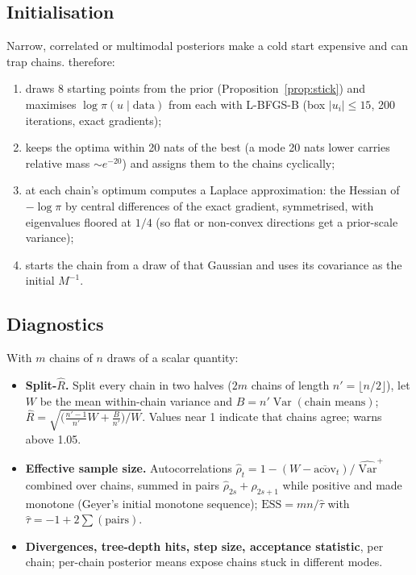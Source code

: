 \documentclass[11pt]{article}
\theoremstyle{definition}
\theoremstyle{remark}
\newcommand{\code}[1]{\texttt{\detokenize{#1}}}
\DeclareMathOperator{\Var}{Var}
\begin{document}
\subsection{Initialisation}
Narrow, correlated or multimodal posteriors make a cold start expensive and can trap chains. \code{exact_gw} therefore:
\begin{enumerate}
\item draws 8 starting points from the prior (Proposition~\ref{prop:stick}) and maximises $\log\pi(u\mid\text{data})$ from each with L-BFGS-B (box $|u_i|\le15$, 200 iterations, exact gradients);
\item keeps the optima within 20 nats of the best (a mode 20 nats lower carries relative mass $\sim e^{-20}$) and assigns them to the chains cyclically;
\item at each chain's optimum computes a Laplace approximation: the Hessian of $-\log\pi$ by central differences of the exact gradient, symmetrised, with eigenvalues floored at $1/4$ (so flat or non-convex directions get a prior-scale variance);
\item starts the chain from a draw of that Gaussian and uses its covariance as the initial $M^{-1}$.
\end{enumerate}

\subsection{Diagnostics}
With $m$ chains of $n$ draws of a scalar quantity:
\begin{itemize}
\item \textbf{Split-$\hat R$.} Split every chain in two halves ($2m$ chains of length $n'=\lfloor n/2\rfloor$), let $W$ be the mean within-chain variance and $B=n'\Var(\text{chain means})$; $\hat R=\sqrt{\big(\frac{n'-1}{n'}W+\frac{B}{n'}\big)/W}$. Values near 1 indicate that chains agree; \code{exact_gw} warns above 1.05.
\item \textbf{Effective sample size.} Autocorrelations $\hat\rho_t=1-(W-\overline{\mathrm{acov}}_t)/\widehat{\Var}^+$ combined over chains, summed in pairs $\hat\rho_{2s}+\hat\rho_{2s+1}$ while positive and made monotone (Geyer's initial monotone sequence); $\mathrm{ESS}=mn/\hat\tau$ with $\hat\tau=-1+2\sum(\text{pairs})$.
\item \textbf{Divergences, tree-depth hits, step size, acceptance statistic}, per chain; per-chain posterior means expose chains stuck in different modes.
\end{itemize}
\end{document}
